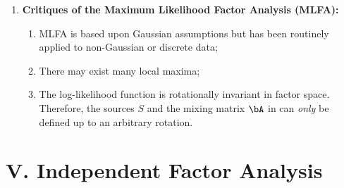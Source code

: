 \documentclass[12pt]{article}
\begin{document}
\begin{enumerate}[label=\textbf{\arabic*.}]
	\item \textbf{Critiques of the Maximum Likelihood Factor Analysis (MLFA):} 
	\begin{enumerate}
		\item MLFA is based upon Gaussian assumptions but has been routinely applied to non-Gaussian or discrete data; 
		\item There may exist many local maxima; 
		\item The log-likelihood function is rotationally invariant in factor space. Therefore, the sources $S$ and the mixing matrix $\bA$ in can \emph{only} be defined up to an arbitrary rotation. 
	\end{enumerate}	

\end{enumerate}


\section*{V. Independent Factor Analysis}
\end{document}
